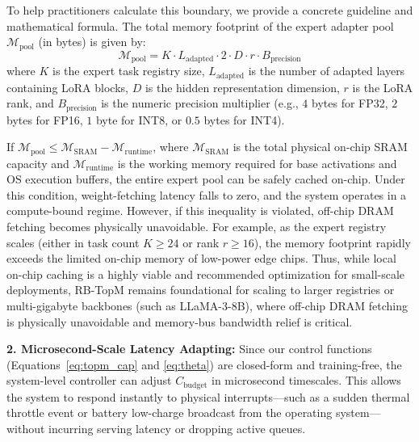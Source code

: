 To help practitioners calculate this boundary, we provide a concrete guideline and mathematical formula. The total memory footprint of the expert adapter pool $\mathcal{M}_{\text{pool}}$ (in bytes) is given by:
\begin{equation}
\mathcal{M}_{\text{pool}} = K \cdot L_{\text{adapted}} \cdot 2 \cdot D \cdot r \cdot B_{\text{precision}}
\label{eq:m_pool}
\end{equation}
where $K$ is the expert task registry size, $L_{\text{adapted}}$ is the number of adapted layers containing LoRA blocks, $D$ is the hidden representation dimension, $r$ is the LoRA rank, and $B_{\text{precision}}$ is the numeric precision multiplier (e.g., $4$ bytes for FP32, $2$ bytes for FP16, $1$ byte for INT8, or $0.5$ bytes for INT4). 

If $\mathcal{M}_{\text{pool}} \le \mathcal{M}_{\text{SRAM}} - \mathcal{M}_{\text{runtime}}$, where $\mathcal{M}_{\text{SRAM}}$ is the total physical on-chip SRAM capacity and $\mathcal{M}_{\text{runtime}}$ is the working memory required for base activations and OS execution buffers, the entire expert pool can be safely cached on-chip. Under this condition, weight-fetching latency falls to zero, and the system operates in a compute-bound regime. However, if this inequality is violated, off-chip DRAM fetching becomes physically unavoidable. For example, as the expert registry scales (either in task count $K \ge 24$ or rank $r \ge 16$), the memory footprint rapidly exceeds the limited on-chip memory of low-power edge chips. Thus, while local on-chip caching is a highly viable and recommended optimization for small-scale deployments, RB-TopM remains foundational for scaling to larger registries or multi-gigabyte backbones (such as LLaMA-3-8B), where off-chip DRAM fetching is physically unavoidable and memory-bus bandwidth relief is critical.

\textbf{2. Microsecond-Scale Latency Adapting:} Since our control functions (Equations~\ref{eq:topm_cap} and \ref{eq:theta}) are closed-form and training-free, the system-level controller can adjust $C_{\text{budget}}$ in microsecond timescales. This allows the system to respond instantly to physical interrupts—such as a sudden thermal throttle event or battery low-charge broadcast from the operating system—without incurring serving latency or dropping active queues.

